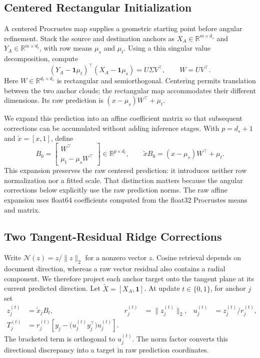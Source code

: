 \subsection{Centered Rectangular Initialization}
\label{sec:initialization}

A centered Procrustes map supplies a geometric starting point before angular
refinement. Stack the source and destination anchors as
$X_A\in\mathbb{R}^{m\times d_s}$ and
$Y_A\in\mathbb{R}^{m\times d_t}$, with row means $\mu_s$ and $\mu_t$.
Using a thin singular value decomposition, compute
\begin{equation}
 (Y_A-\mathbf{1}\mu_t)^\top(X_A-\mathbf{1}\mu_s)
 =U\Sigma V^\top,\qquad W=UV^\top .
 \label{eq:procrustes}
\end{equation}
Here $W\in\mathbb{R}^{d_t\times d_s}$ is rectangular and semiorthogonal.
Centering permits translation between the two anchor clouds; the rectangular
map accommodates their different dimensions. Its raw prediction is
$(x-\mu_s)W^\top+\mu_t$.

We expand this prediction into an affine coefficient matrix so that subsequent
corrections can be accumulated without adding inference stages. With
$p=d_s+1$ and $\widetilde{x}=[x,1]$, define
\begin{equation}
 B_0=\begin{bmatrix}W^\top\\ \mu_t-\mu_sW^\top\end{bmatrix}
 \in\mathbb{R}^{p\times d_t},\qquad
 \widetilde{x}B_0=(x-\mu_s)W^\top+\mu_t .
 \label{eq:affine-init}
\end{equation}
This expansion preserves the raw centered prediction: it introduces neither
row normalization nor a fitted scale. That distinction matters because the
angular corrections below explicitly use the raw prediction norms.
The raw affine expansion uses float64 coefficients computed from the
float32 Procrustes means and matrix.

\subsection{Two Tangent-Residual Ridge Corrections}
\label{sec:tangent}

Write $\mathcal N(z)=z/\|z\|_2$ for a nonzero vector $z$.
Cosine retrieval depends on document direction, whereas a raw vector residual
also contains a radial component. We therefore project each anchor target
onto the tangent plane at its current predicted direction. Let
$\widetilde{X}=[X_A,\mathbf{1}]$. At update $t\in\{0,1\}$, for anchor $j$ set
\begin{align}
 z_j^{(t)}&=\widetilde{x}_jB_t,&
 r_j^{(t)}&=\|z_j^{(t)}\|_2,&
 u_j^{(t)}&=z_j^{(t)}/r_j^{(t)},\nonumber\\
 T_j^{(t)}&=r_j^{(t)}\left[y_j-
 \bigl(u_j^{(t)}y_j^\top\bigr)u_j^{(t)}\right].
 \label{eq:tangent-target}
\end{align}
The bracketed term is orthogonal to $u_j^{(t)}$. The norm factor converts this
directional discrepancy into a target in raw prediction coordinates.

